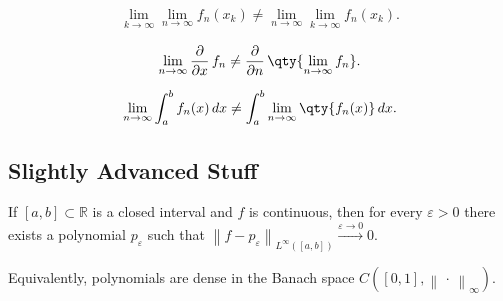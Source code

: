 \begin{proposition}

\begin{align*}  
\lim_{k\to \infty} \lim_{n\to\infty} f_n(x_k) \neq
\lim_{n\to \infty} \lim_{k\to\infty} f_n(x_k)
.\end{align*}

\end{proposition}

\begin{proposition}

\begin{align*}  
\lim_{n\to \infty} {\frac{\partial }{\partial x}\,} f_n \neq {\frac{\partial }{\partial n}\,} \qty{\lim_{n\to \infty} f_n}
.\end{align*}

\end{proposition}

\begin{proposition}[?]

\begin{align*}  
\lim_{n\to \infty} \int_a^b f_n(x) \,dx \neq \int_a^b \lim_{n\to \infty} \qty{ f_n(x) } \,dx
.\end{align*}

\end{proposition}

\hypertarget{slightly-advanced-stuff}{%
\subsection{Slightly Advanced Stuff}\label{slightly-advanced-stuff}}

\begin{theorem}

If \([a, b] \subset {\mathbb{R}}\) is a closed interval and \(f\) is
continuous, then for every \(\varepsilon> 0\) there exists a polynomial
\(p_\varepsilon\) such that
\({\left\lVert {f- p_\varepsilon} \right\rVert}_{L^\infty([a, b])} \overset{\varepsilon\to 0}\to 0\).

Equivalently, polynomials are dense in the Banach space
\(C([0, 1], {\left\lVert {{\,\cdot\,}} \right\rVert}_\infty)\).

\end{theorem}


